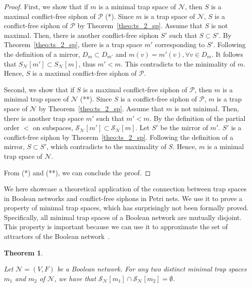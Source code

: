 \documentclass[preprint,12pt]{elsarticle}
\newtheorem{theorem}{Theorem}[section]
\begin{document}
\begin{proof}

  First, we show that if \(m\) is a minimal trap space of \(\mathcal{N}\), then \(S\) is a maximal conflict-free siphon of \(\mathcal{P}\) (*). 
  Since \(m\) is a trap space of \(\mathcal{N}\), \(S\) is a conflict-free siphon of \(\mathcal{P}\) by Theorem~\ref{theo:ts_2_sp}. Assume that \(S\) is not maximal. 
  Then, there is another conflict-free siphon \(S'\) such that \(S \subset S'\). 
  By Theorem~\ref{theo:ts_2_sp}, there is a trap space \(m'\) corresponding to \(S'\). 
  Following the definition of a mirror, \(D_m \subset D_{m'}\) and \(m(v) = m'(v), \forall v \in D_m\).
  It follows that \(S_{\mathcal{N}}[m'] \subset S_{\mathcal{N}}[m]\), thus \(m' < m\).
  This contradicts to the minimality of \(m\). 
  Hence, \(S\) is a maximal conflict-free siphon of \(\mathcal{P}\).

  Second, we show that if \(S\) is a maximal conflict-free siphon of \(\mathcal{P}\), then \(m\) is a minimal trap space of \(\mathcal{N}\) (**).
  Since \(S\) is a conflict-free siphon of \(\mathcal{P}\), \(m\) is a trap space of \(\mathcal{N}\) by Theorem~\ref{theo:ts_2_sp}. 
  Assume that \(m\) is not minimal.
  Then, there is another trap space \(m'\) such that \(m' < m\).
  By the definition of the partial order \(<\) on subspaces, \(\mathcal{S}_{\mathcal{N}}[m'] \subset \mathcal{S}_{\mathcal{N}}[m]\). Let \(S'\) be the mirror of \(m'\).
  \(S'\) is a conflict-free siphon by Theorem~\ref{theo:ts_2_sp}. 
  Following the definition of a mirror, \(S \subset S'\), which contradicts to the maximality of \(S\).
  Hence, \(m\) is a minimal trap space of \(\mathcal{N}\).

  From (*) and (**), we can conclude the proof.
\end{proof}

We here showcase a theoretical application of the connection between trap spaces in Boolean networks and conflict-free siphons in Petri nets.
We use it to prove a property of minimal trap spaces, which has surprisingly not been formally proved.
Specifically, all minimal trap spaces of a Boolean network are mutually disjoint.
This property is important because we can use it to approximate the set of attractors of the Boolean network~\cite{klarner2015computing}.

\begin{theorem}%
\label{theo:separation_min_ts}

  Let \(\mathcal{N} = (V, F)\) be a Boolean network.
  For any two distinct minimal trap spaces \(m_1\) and \(m_2\) of \(\mathcal{N}\), we have that \(\mathcal{S}_{\mathcal{N}}[m_1] \cap \mathcal{S}_{\mathcal{N}}[m_2] = \emptyset\).

\end{theorem}
\end{document}
